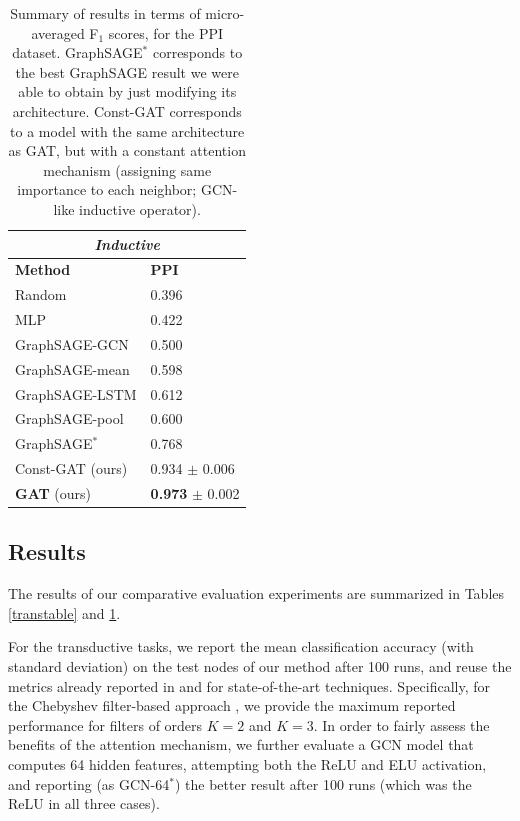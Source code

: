 \documentclass{article} %
\begin{document}
\begin{table}
\caption{Summary of results in terms of micro-averaged F$_1$ scores, for the PPI dataset. GraphSAGE$^*$ corresponds to the best GraphSAGE result we were able to obtain by just modifying its architecture. Const-GAT corresponds to a model with the same architecture as GAT, but with a constant attention mechanism (assigning same importance to each neighbor; GCN-like inductive operator).}
\label{indtable}
\begin{center}
\begin{tabular}{l l}
\multicolumn{2}{c}{\textbf{\emph{Inductive}}}\\
\toprule 
{\bf Method} & {\bf PPI}\\ \midrule
Random & 0.396\\
MLP & 0.422 \\
GraphSAGE-GCN \citep{hamilton2017inductive} & 0.500 \\
GraphSAGE-mean \citep{hamilton2017inductive} & 0.598 \\
GraphSAGE-LSTM \citep{hamilton2017inductive} & 0.612 \\
GraphSAGE-pool \citep{hamilton2017inductive} & 0.600 \\\midrule
GraphSAGE$^*$ & 0.768\\
Const-GAT (ours) & 0.934 $\pm$ 0.006\\
{\bf GAT} (ours) & {\bf 0.973} $\pm$ 0.002  \\\bottomrule%
\end{tabular}
\end{center}
\end{table}

\subsection{Results}
The results of our comparative evaluation experiments are summarized in Tables \ref{transtable} and \ref{indtable}. 

For the transductive tasks, we report the mean classification accuracy (with standard deviation) on the test nodes of our method after 100 runs, and reuse the metrics already reported in \cite{kipf2016semi} and \cite{monti2016geometric} for state-of-the-art techniques. Specifically, for the Chebyshev filter-based approach \citep{defferrard2016convolutional}, we provide the maximum reported performance for filters of orders $K=2$ and $K=3$. In order to fairly assess the benefits of the attention mechanism, we further evaluate a GCN model that computes 64 hidden features, attempting both the ReLU and ELU activation, and reporting (as GCN-64$^*$) the better result after 100 runs (which was the ReLU in all three cases).
\end{document}
